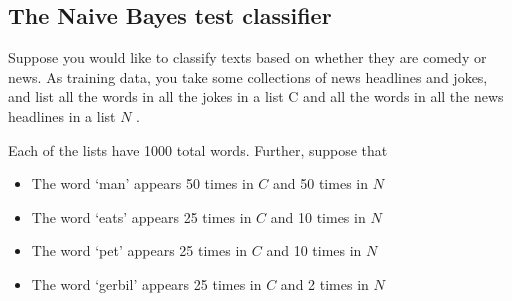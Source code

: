 \documentclass[hidelinks]{article}
\begin{document}
\subsection{The Naive Bayes test classifier}
Suppose you would like to classify texts based on whether they are comedy or news. As
training data, you take some collections of news headlines and jokes, and list all the words
in all the jokes in a list C and all the words in all the news headlines in a list $N$ .

Each of the lists have 1000 total words. Further, suppose that
\begin{itemize}
    \item The word ‘man’ appears 50 times in $C$ and 50 times in $N$
    \item The word ‘eats’ appears 25 times in $C$ and 10 times in $N$
    \item The word ‘pet’ appears 25 times in $C$ and 10 times in $N$
    \item The word ‘gerbil’ appears 25 times in $C$ and 2 times in $N$ 
\end{itemize}
\end{document}
